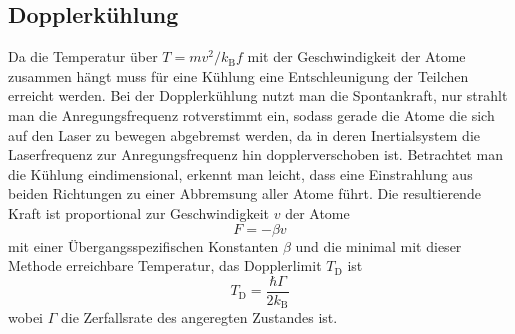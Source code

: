 \documentclass[twoside,colorback,accentcolor=tud4c,11pt]{tudreport}
\begin{document}
\subsection{Dopplerkühlung}\label{subsec:doppler}
Da die Temperatur über $ T=mv^2/k_\text{B}f $ mit der Geschwindigkeit der Atome zusammen hängt muss für eine Kühlung eine Entschleunigung der Teilchen erreicht werden. Bei der Dopplerkühlung nutzt man die Spontankraft, nur strahlt man die Anregungsfrequenz rotverstimmt ein, sodass gerade die Atome die sich auf den Laser zu bewegen abgebremst werden, da in deren Inertialsystem die Laserfrequenz zur Anregungsfrequenz hin dopplerverschoben ist. Betrachtet man die Kühlung eindimensional, erkennt man leicht, dass eine Einstrahlung aus beiden Richtungen zu einer Abbremsung aller Atome führt. Die resultierende Kraft ist proportional zur Geschwindigkeit $ v $ der Atome
\begin{equation}
F= -\beta v
\end{equation}
mit einer Übergangsspezifischen Konstanten $ \beta $ \cite{anl} und die minimal mit dieser Methode erreichbare Temperatur, das Dopplerlimit $ T_\text{D} $ ist
\begin{equation}
T_\text{D}=\frac{\hbar\Gamma}{2k_\text{B}}
\end{equation}
wobei $ \Gamma $ die Zerfallsrate des angeregten Zustandes ist.
\end{document}
